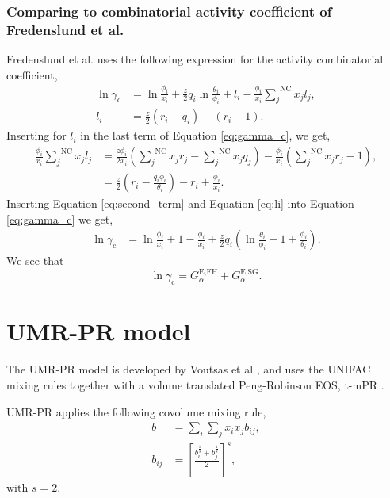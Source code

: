 \documentclass[english]{../thermomemo/thermomemo}
\newcommand*{\ousum}[2]{\overset{#1}{\underset{#2}{\sum}}}
\newcommand{\excess}{\text{E}\xspace}
\newcommand{\FH}{\text{FH}\xspace}
\newcommand{\SG}{\text{SG}\xspace}
\newcommand{\NC}{\text{NC}\xspace}
\begin{document}
\subsubsection{Comparing to combinatorial activity coefficient of Fredenslund et al.}
Fredenslund et al. \cite{Fredenslund1975} uses the following expression for the activity combinatorial coefficient,
\begin{align}
  \ln \gamma_{\text{c}} &= \ln \frac{\phi_i}{x_i} + \frac{z}{2} q_i \ln \frac{\theta_i}{\phi_i} + l_i - \frac{\phi_i}{x_i}\ousum{\NC}{j} x_j l_j , \label{eq:gamma_c} \\
  l_i &= \frac{z}{2} \left(r_i - q_i\right) - \left(r_i - 1\right) . \label{eq:li}
\end{align}
Inserting for $l_i$ in the last term of Equation \ref{eq:gamma_c}, we get,
\begin{align}
  \frac{\phi_i}{x_i}\ousum{\NC}{j} x_j l_j &= \frac{z\phi_i}{2x_i}\left(\ousum{\NC}{j} x_j r_j - \ousum{\NC}{j}x_jq_j\right) - \frac{\phi_i}{x_i}\left(\ousum{\NC}{j} x_j r_j - 1\right), \\
  &= \frac{z}{2}\left(r_i - \frac{q_i\phi_i}{\theta_i}\right) - r_i + \frac{\phi_i}{x_i}. \label{eq:second_term}
\end{align}
Inserting Equation \ref{eq:second_term} and Equation \ref{eq:li} into Equation \ref{eq:gamma_c} we get,
\begin{align}
  \ln \gamma_{\text{c}} &= \ln \frac{\phi_i}{x_i} + 1 - \frac{\phi_i}{x_i} + \frac{z}{2} q_i \left(\ln \frac{\theta_i}{\phi_i} -1 + \frac{\phi_i}{\theta_i}\right).
\end{align}
We see that
\begin{equation}
  \ln \gamma_{\text{c}} = G^{\excess,\FH}_\alpha + G^{\excess,\SG}_\alpha.
\end{equation}
\section{UMR-PR model}
The UMR-PR model is developed by Voutsas et al \cite{Voutsas2004}, and
uses the UNIFAC mixing rules together with a volume translated
Peng-Robinson EOS, t-mPR \cite{Avlonitis1994}.

UMR-PR applies the following covolume mixing rule,
\begin{align}
  b &= \underset{i}{\sum} \underset{j}{\sum} x_i x_j b_{ij},\\
  b_{ij} &= \left[\frac{b_i^{\frac{1}{s}} + b_j^{\frac{1}{s}}}{2}\right]^s,
  \label{eq:bij}
\end{align}
with $s=2$.
\end{document}
